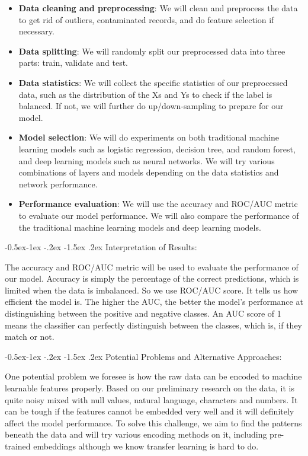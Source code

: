 \documentclass[11pt,]{article}
\makeatletter
\providecommand{\tightlist}{%
  \setlength{\itemsep}{0pt}\setlength{\parskip}{0pt}}
\renewcommand\paragraph{
  \@startsection{paragraph}{4}{\z@}
    {-0.5ex\@plus -1ex \@minus -.2ex}%
    {-1.5ex \@plus .2ex}%
    {\normalfont\normalsize\bf}} %
\makeatother
\begin{document}
\begin{itemize}
\tightlist
\item
  \textbf{Data cleaning and preprocessing}: We will clean and preprocess
  the data to get rid of outliers, contaminated records, and do feature
  selection if necessary.
\item
  \textbf{Data splitting}: We will randomly split our preprocessed data
  into three parts: train, validate and test.
\item
  \textbf{Data statistics}: We will collect the specific statistics of
  our preprocessed data, such as the distribution of the Xs and Ys to
  check if the label is balanced. If not, we will further do
  up/down-sampling to prepare for our model.
\item
  \textbf{Model selection}: We will do experiments on both traditional
  machine learning models such as logistic regression, decision tree,
  and random forest, and deep learning models such as neural networks.
  We will try various combinations of layers and models depending on the
  data statistics and network performance.
\item
  \textbf{Performance evaluation}: We will use the accuracy and ROC/AUC
  metric to evaluate our model performance. We will also compare the
  performance of the traditional machine learning models and deep
  learning models.
\end{itemize}

\paragraph{Interpretation of
Results:}\label{interpretation-of-results-1}

The accuracy and ROC/AUC metric will be used to evaluate the performance
of our model. Accuracy is simply the percentage of the correct
predictions, which is limited when the data is imbalanced. So we use
ROC/AUC score. It tells us how efficient the model is. The higher the
AUC, the better the model's performance at distinguishing between the
positive and negative classes. An AUC score of 1 means the classifier
can perfectly distinguish between the classes, which is, if they match
or not.

\paragraph{Potential Problems and Alternative
Approaches:}\label{potential-problems-and-alternative-approaches-1}

One potential problem we foresee is how the raw data can be encoded to
machine learnable features properly. Based on our preliminary research
on the data, it is quite noisy mixed with null values, natural language,
characters and numbers. It can be tough if the features cannot be
embedded very well and it will definitely affect the model performance.
To solve this challenge, we aim to find the patterns beneath the data
and will try various encoding methods on it, including pre-trained
embeddings although we know transfer learning is hard to do.


\end{document}
